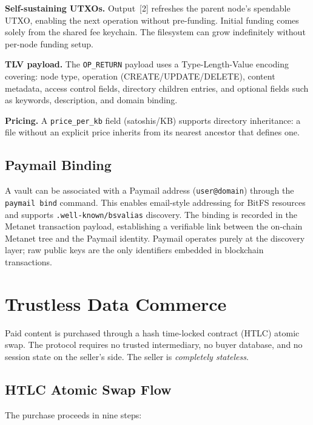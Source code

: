 \documentclass[11pt,a4paper]{article}
\begin{document}
\textbf{Self-sustaining UTXOs.} Output~[2] refreshes the parent node's spendable UTXO, enabling the next operation without pre-funding. Initial funding comes solely from the shared fee keychain. The filesystem can grow indefinitely without per-node funding setup.

\textbf{TLV payload.} The \texttt{OP\_RETURN} payload uses a Type-Length-Value encoding covering: node type, operation (CREATE/UPDATE/DELETE), content metadata, access control fields, directory children entries, and optional fields such as keywords, description, and domain binding.

\textbf{Pricing.} A \texttt{price\_per\_kb} field (satoshis/KB) supports directory inheritance: a file without an explicit price inherits from its nearest ancestor that defines one.

\subsection{Paymail Binding}

A vault can be associated with a Paymail address (\texttt{user@domain}) through the \texttt{paymail bind} command. This enables email-style addressing for BitFS resources and supports \texttt{.well-known/bsvalias} discovery. The binding is recorded in the Metanet transaction payload, establishing a verifiable link between the on-chain Metanet tree and the Paymail identity. Paymail operates purely at the discovery layer; raw public keys are the only identifiers embedded in blockchain transactions.

\section{Trustless Data Commerce}
\label{sec:commerce}

Paid content is purchased through a hash time-locked contract (HTLC) atomic swap. The protocol requires no trusted intermediary, no buyer database, and no session state on the seller's side. The seller is \emph{completely stateless}.

\subsection{HTLC Atomic Swap Flow}

The purchase proceeds in nine steps:
\end{document}
